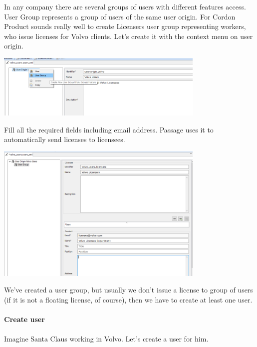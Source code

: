 \documentclass[12pt]{report}
\begin{document}
In any company there are several groups of users with different features access. User Group represents a group of users of the same user origin.
For Cordon Product sounds really well to create Licensers user group representing workers, who issue licenses for Volvo clients. 
Let's create it with the context menu on user origin.

\begin{center}
    \includegraphics[width=0.75\textwidth]{user_group_create}
\end{center}

Fill all the required fields including email address. Passage uses it to automatically send licenses to licensees.

\begin{center}
    \includegraphics[width=0.75\textwidth]{user_group_created}
\end{center}

We've created a user group, but usually we don't issue a license to group of users (if it is not a floating license, of course), then we have to create at least one user.

\paragraph*{Create user}
\paragraph*{}

Imagine Santa Claus working in Volvo. Let's create a user for him.
\end{document}
